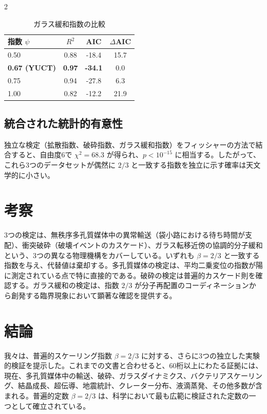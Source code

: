 \documentclass[11pt,a4paper]{article}
\newcommand{\betaf}{\beta}
\begin{document}
\begin{multicols}{2}
		\begin{table}[htbp]
			\centering
			\caption{ガラス緩和指数の比較}
			\label{tab:glass}
			\begin{tabular}{lccc}
				\toprule
				指数 \(\psi\) & \(R^2\) & AIC & \(\Delta\)AIC \\
				\midrule
				0.50 & 0.88 & -18.4 & 15.7 \\
				\textbf{0.67 (YUCT)} & \textbf{0.97} & \textbf{-34.1} & 0.0 \\
				0.75 & 0.94 & -27.8 & 6.3 \\
				1.00 & 0.82 & -12.2 & 21.9 \\
				\bottomrule
			\end{tabular}
		\end{table}
		
		\subsection{統合された統計的有意性}
		独立な検定（拡散指数、破砕指数、ガラス緩和指数）をフィッシャーの方法で結合すると、自由度6で \(\chi^2 = 68.3\) が得られ、\(p < 10^{-15}\) に相当する。したがって、これら3つのデータセットが偶然に \(2/3\) と一致する指数を独立に示す確率は天文学的に小さい。
		
		\section{考察}
		
		3つの検定は、無秩序多孔質媒体中の異常輸送（袋小路における待ち時間が支配）、衝突破砕（破壊イベントのカスケード）、ガラス転移近傍の協調的分子緩和という、3つの異なる物理機構をカバーしている。いずれも \(\betaf = 2/3\) と一致する指数を与え、代替値は棄却する。多孔質媒体の検定は、平均二乗変位の指数が陽に測定されている点で特に直接的である。破砕の検定は普遍的カスケード則を確認する。ガラス緩和の検定は、指数 \(2/3\) が分子再配置のコーディネーションから創発する臨界現象において顕著な確認を提供する。
		
		\section{結論}
		
		我々は、普遍的スケーリング指数 \(\betaf = 2/3\) に対する、さらに3つの独立した実験的検証を提示した。これまでの文書と合わせると、60桁以上にわたる証拠には、現在、多孔質媒体中の輸送、破砕、ガラスダイナミクス、バクテリアスケーリング、結晶成長、超伝導、地震統計、クレーター分布、液滴蒸発、その他多数が含まれる。普遍的定数 \(\betaf = 2/3\) は、科学において最も広範に検証された定数の一つとして確立されている。
		

\end{multicols}
\end{document}
